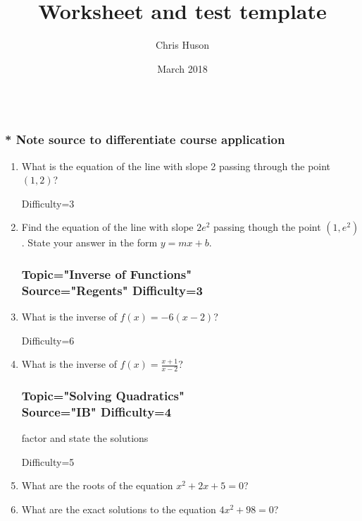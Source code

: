 \documentclass[12pt, oneside]{article}
\title{Worksheet and test template}
\author{Chris Huson}
\date{March 2018}
\begin{document}
\subsubsection*{\\* Note source to differentiate course application}

\begin{enumerate}

\vspace{0.5 cm}


\subsubsection*{Topic="Writing Linear Equations"\\
Source="cjh" 
Difficulty=2}

\item What is the equation of the line with slope 2 passing through the point $(1, 2)$?

Difficulty=3
\item Find the equation of the line with slope $2e^2$ passing though the point $(1, e^2)$. State your answer in the form $y=mx+b$.

\subsubsection*{Topic="Inverse of Functions"\\
Source="Regents" 
Difficulty=3}

\item What is the inverse of $f(x)=-6(x-2)$? %

Difficulty=6
\item What is the inverse of $\displaystyle f(x)=\frac{x+1}{x-2}$? %

\subsubsection*{Topic="Solving Quadratics"\\
Source="IB" 
Difficulty=4}
factor and state the solutions

Difficulty=5
\item What are the roots of the equation $x^2+ 2x+5 =0$? %

\item What are the exact solutions to the equation $4x^2+98=0$? %


\end{enumerate}
\end{document}
